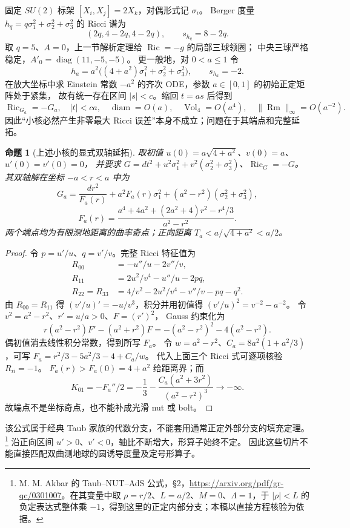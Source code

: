\documentclass[UTF8,fontset=fandol,zihao=-4,oneside,openany]{ctexbook}
\theoremstyle{cjkplain}
\newtheorem{proposition}[theorem]{命题}
\numberwithin{equation}{chapter}
\DeclareMathOperator{\Ric}{Ric}
\DeclareMathOperator{\Rm}{Rm}
\begin{document}
固定 \(SU(2)\) 标架 \([X_i,X_j]=2X_k\)，对偶形式记 \(\sigma_i\)。
Berger 度量 \(h_q=q\sigma_1^2+\sigma_2^2+\sigma_3^2\) 的 Ricci 谱为
\[
(2q,4-2q,4-2q),\qquad s_{h_q}=8-2q.
\]
取 \(q=5\)、\(A=0\)，上一节解析定理给 \(\Ric=-g\) 的局部三球领圈；
中央三球严格稳定，\(A'_0=\operatorname{diag}(11,-5,-5)\)。
更一般地，对 \(0<a\le1\) 令
\[
h_a=a^2\bigl((4+a^2)\sigma_1^2+\sigma_2^2+\sigma_3^2\bigr),
\qquad s_{h_a}=-2.
\]
在放大坐标中求 Einstein 常数 \(-a^2\) 的齐次 ODE，参数 \(a\in[0,1]\) 的初始正定矩阵处于紧集，
故有统一存在区间 \(|s|<c\)。缩回 \(t=as\) 后得到
\[
\Ric_{G_a}=-G_a,\quad |t|<ca,\quad
\operatorname{diam}=O(a),\quad\operatorname{Vol}_4=O(a^4),
\quad\|\Rm\|_\infty=O(a^{-2}).
\]
因此“小核必然产生非零最大 Ricci 误差”本身不成立；问题在于其端点和完整延拓。

\begin{proposition}[上述小核的显式双轴延拓]
取初值
\(u(0)=a\sqrt{4+a^2}\)、\(v(0)=a\)、\(u'(0)=v'(0)=0\)，
并要求 \(G=dt^2+u^2\sigma_1^2+v^2(\sigma_2^2+\sigma_3^2)\)、\(\Ric_G=-G\)。
其双轴解在坐标 \(-a<r<a\) 中为
\[
G_a=\frac{dr^2}{F_a(r)}+a^2F_a(r)\sigma_1^2
 +(a^2-r^2)(\sigma_2^2+\sigma_3^2),
\]
\[
F_a(r)=\frac{a^4+4a^2+(2a^2+4)r^2-r^4/3}{a^2-r^2}.
\]
两个端点均为有限测地距离的曲率奇点；正向距离
\(T_a<a/\sqrt{4+a^2}<a/2\)。
\end{proposition}
\begin{proof}
令 \(p=u'/u\)、\(q=v'/v\)。完整 Ricci 特征值为
\[
\begin{aligned}
R_{00}&=-u''/u-2v''/v,\\
R_{11}&=2u^2/v^4-u''/u-2pq,\\
R_{22}=R_{33}&=4/v^2-2u^2/v^4-v''/v-pq-q^2.
\end{aligned}
\]
由 \(R_{00}=R_{11}\) 得
\((v'/u)'=-u/v^3\)，积分并用初值得
\((v'/u)^2=v^{-2}-a^{-2}\)。
令 \(v^2=a^2-r^2\)、\(r'=u/a>0\)、\(F=(r')^2\)，
Gauss 约束化为
\[
r(a^2-r^2)F'-(a^2+r^2)F
=-(a^2-r^2)^2-4(a^2-r^2).
\]
偶初值消去线性积分常数，得到所写 \(F_a\)。
令 \(w=a^2-r^2\)、\(C_a=8a^2(1+a^2/3)\)，可写
\(F_a=r^2/3-5a^2/3-4+C_a/w\)。
代入上面三个 Ricci 式可逐项核验 \(R_{ii}=-1\)。
\(F_a(r)>F_a(0)=4+a^2\) 给距离界；而
\[
K_{01}=-F_a''/2
=-\frac13-\frac{C_a(a^2+3r^2)}{(a^2-r^2)^3}\longrightarrow-\infty.
\]
故端点不是坐标奇点，也不能补成光滑 nut 或 bolt。
\end{proof}
该公式属于经典 Taub 家族的代数分支，不能套用通常正定外部分支的填充定理。\footnote{M. M. Akbar 的 Taub--NUT--AdS 公式，\S2，\url{https://arxiv.org/pdf/gr-qc/0301007}。在其变量中取 \(\rho=r/2\)、\(L=a/2\)、\(M=0\)、\(\Lambda=1\)，于 \(|\rho|<L\) 的负定表达式整体乘 \(-1\)，得到这里的正定内部分支；本稿以直接方程核验为依据。}
沿正向区间 \(u'>0\)、\(v'<0\)，轴比不断增大，形算子始终不定。
因此这些切片不能直接匹配双曲测地球的圆诱导度量及定号形算子。
\end{document}
